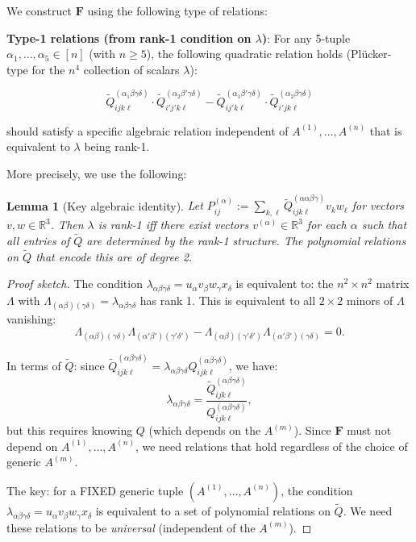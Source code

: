 \documentclass[12pt]{article}
\newtheorem{lemma}{Lemma}
\theoremstyle{definition}
\begin{document}
We construct $\mathbf{F}$ using the following type of relations:

\textbf{Type-1 relations (from rank-1 condition on $\lambda$)}: For any 5-tuple $\alpha_1,\ldots,\alpha_5\in[n]$ (with $n\geq 5$), the following quadratic relation holds (Plücker-type for the $n^4$ collection of scalars $\lambda$):

$$\tilde{Q}^{(\alpha_1\beta\gamma\delta)}_{ijk\ell}\cdot\tilde{Q}^{(\alpha_2\beta'\gamma\delta)}_{i'j'k\ell} - \tilde{Q}^{(\alpha_1\beta'\gamma\delta)}_{ij'k\ell}\cdot\tilde{Q}^{(\alpha_2\beta\gamma\delta)}_{i'jk\ell}$$

should satisfy a specific algebraic relation independent of $A^{(1)},\ldots,A^{(n)}$ that is equivalent to $\lambda$ being rank-1.

More precisely, we use the following:

\begin{lemma}[Key algebraic identity]\label{lem:key}
Let $P^{(\alpha)}_{ij} := \sum_{k,\ell}\tilde{Q}^{(\alpha\alpha\beta\gamma)}_{ij k\ell}v_kw_\ell$ for vectors $v,w\in\mathbb{R}^3$. Then $\lambda$ is rank-1 iff there exist vectors $v^{(\alpha)}\in\mathbb{R}^3$ for each $\alpha$ such that all entries of $\tilde{Q}$ are determined by the rank-1 structure. The polynomial relations on $\tilde{Q}$ that encode this are of degree 2.
\end{lemma}

\begin{proof}[Proof sketch]
The condition $\lambda_{\alpha\beta\gamma\delta} = u_\alpha v_\beta w_\gamma x_\delta$ is equivalent to: the $n^2\times n^2$ matrix $\Lambda$ with $\Lambda_{(\alpha\beta)(\gamma\delta)} = \lambda_{\alpha\beta\gamma\delta}$ has rank 1. This is equivalent to all $2\times 2$ minors of $\Lambda$ vanishing:
$$\Lambda_{(\alpha\beta)(\gamma\delta)}\Lambda_{(\alpha'\beta')(\gamma'\delta')} - \Lambda_{(\alpha\beta)(\gamma'\delta')}\Lambda_{(\alpha'\beta')(\gamma\delta)} = 0.$$

In terms of $\tilde{Q}$: since $\tilde{Q}^{(\alpha\beta\gamma\delta)}_{ijk\ell} = \lambda_{\alpha\beta\gamma\delta}Q^{(\alpha\beta\gamma\delta)}_{ijk\ell}$, we have:
$$\lambda_{\alpha\beta\gamma\delta} = \frac{\tilde{Q}^{(\alpha\beta\gamma\delta)}_{ijk\ell}}{Q^{(\alpha\beta\gamma\delta)}_{ijk\ell}},$$
but this requires knowing $Q$ (which depends on the $A^{(m)}$). Since $\mathbf{F}$ must not depend on $A^{(1)},\ldots,A^{(n)}$, we need relations that hold regardless of the choice of generic $A^{(m)}$.

The key: for a FIXED generic tuple $(A^{(1)},\ldots,A^{(n)})$, the condition $\lambda_{\alpha\beta\gamma\delta} = u_\alpha v_\beta w_\gamma x_\delta$ is equivalent to a set of polynomial relations on $\tilde{Q}$. We need these relations to be \emph{universal} (independent of the $A^{(m)}$).
\end{proof}
\end{document}
